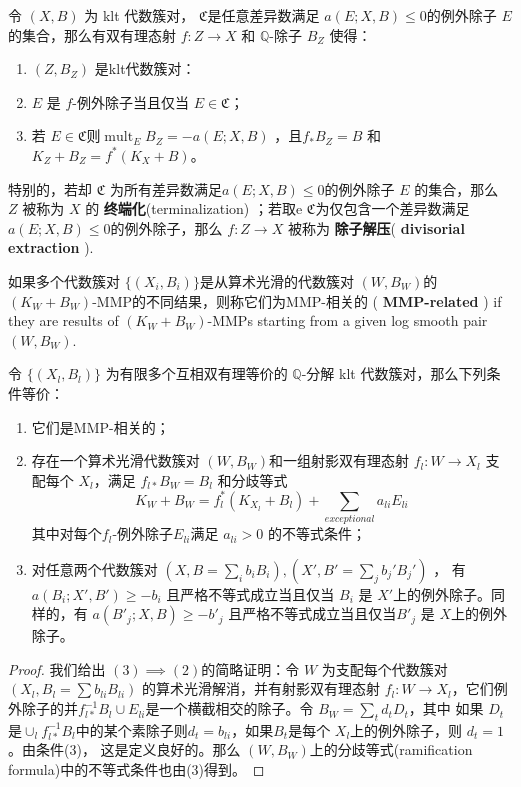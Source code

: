 \begin{corollary}\label{extraction}
	\cite[Corollary 13.7]{haconMinimalModelProgram2012} 令 $ (X,B) $ 为 klt 代数簇对， $\mathfrak{C}$是任意差异数满足 $ a(E;X,B)\leqslant 0 $的例外除子 $E$ 的集合，那么有双有理态射 $ f:Z\to X $ 和 $ \mathbb{Q} $-除子 $ B_Z $ 使得：
	\begin{enumerate}
		\item $ (Z,B_Z) $ 是klt代数簇对：
		\item $ E $ 是 $f$-例外除子当且仅当 $ E\in \mathfrak{C} $；
		\item  若 $E \in \mathfrak{C}$则$ \operatorname{mult}_{E}B_Z=-a(E;X,B) $ ，且$ f_*B_Z=B $ 和 $ K_Z+B_Z=f^*(K_X+B) $。
	\end{enumerate}
	特别的，若却 $\mathfrak{C}$ 为所有差异数满足$a(E; X, B)\leqslant 0$的例外除子 $E$ 的集合，那么 $ Z $ 被称为 $X$ 的 \textbf{终端化}(terminalization) ；若取e $\mathfrak{C}$为仅包含一个差异数满足 $a(E; X, B)\leqslant 0$的例外除子，那么 $ f: Z\to X $ 被称为 \textbf{除子解压}( \textbf{divisorial extraction} ).
\end{corollary}

\begin{definition}
	\cite[Definition 3.3]{brunoLogSarkisovProgram1995}
	如果多个代数簇对 $ \{(X_i,B_i)\} $是从算术光滑的代数簇对 $(W,B_{W})$的 $(K_{W}+B_{W}) $-MMP的不同结果，则称它们为MMP-相关的 ( \textbf{MMP-related} ) if they are results of $ (K_W+B_W) $-MMPs starting from a given log smooth pair $(W,B_{W})$.
\end{definition}

\begin{lemma}\label{MMP-相关的条件}
	\cite[Proposition 3.4]{brunoLogSarkisovProgram1995}
	令 $ \{(X_l,B_l)\} $ 为有限多个互相双有理等价的 $ \mathbb{Q} $-分解 klt 代数簇对，那么下列条件等价：
	\begin{enumerate}
		\item 它们是MMP-相关的；
		\item 存在一个算术光滑代数簇对 $ (W,B_W) $和一组射影双有理态射  $ f_l:W\to  X_l $ 支配每个 $ X_l $，满足 $ f_{l*}B_W=B_l $ 和分歧等式
		      \[ K_W+B_W=f_l^*(K_{X_l}+B_l)+\sum_{exceptional}{a_{li}E_{li}} \]
		      其中对每个$ f_l $-例外除子$E_{li}$满足 $a_{li}>0$ 的不等式条件；
		\item 对任意两个代数簇对 $ (X,B=\sum_ib_{i }B_i),(X',B'=\sum_{j}b_{j}'B_{j}') $ ， 有  $ a(B_i;X',B')\geqslant -b_i $ 且严格不等式成立当且仅当 $ B_i $ 是 $ X' $上的例外除子。同样的，有 $ a(B'_j;X,B)\geqslant -b'_j $ 且严格不等式成立当且仅当$ B'_j $ 是 $ X $上的例外除子。
	\end{enumerate}
\end{lemma}
\begin{proof}
  我们给出  $(3) \implies (2)$的简略证明：令 $W$ 为支配每个代数簇对 $(X_l,B_l=\sum b_{li}B_{li})$ 的算术光滑解消，并有射影双有理态射 $f_l:W\to X_l$，它们例外除子的并$f_{l*}^{-1}B_l\cup E_{li}$是一个横截相交的除子。令 $B_W=\sum_t d_tD_t $，其中  如果 $D_t$ 是$\cup_l f_{l*}^{-1}B_l$中的某个素除子则$d_t = b_{li}$，如果$B_{t}$是每个 $X_{l}$上的例外除子，则  $d_t=1$。由条件(3)， 这是定义良好的。那么 $(W,B_{W})$上的分歧等式(ramification formula)中的不等式条件也由(3)得到。
\end{proof}

